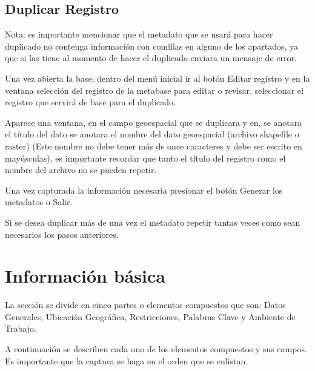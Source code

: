 \documentclass[twoside]{book}
\begin{document}
\section{Duplicar Registro}


Nota: es importante mencionar que el metadato que se usará para hacer duplicado no contenga información con comillas en alguno de los apartados, ya que si las tiene al momento de hacer el duplicado enviara un mensaje de error. 

Una vez abierta la base, dentro del menú inicial ir al botón Editar registro y en la ventana selección del registro de la metabase para editar o revisar, seleccionar el registro que servirá de base para el duplicado.

Aparece una ventana, en el campo geoespacial que se duplicara y en, se anotara el título del dato se anotara el nombre del dato geoespacial (archivo shapefile o raster) (Este nombre no debe tener más de once caracteres y debe ser escrito en mayúsculas), es importante recordar que tanto el título del registro como el nombre del archivo no se pueden repetir.

Una vez capturada la información necesaria presionar el botón Generar los metadatos o Salir.

Si se desea duplicar más de una vez el metadato repetir tantas veces como sean necesarios los pasos anteriores.

\chapter{Información básica}

La sección se divide en cinco partes o elementos compuestos que son: Datos Generales, Ubicación Geográfica, Restricciones, Palabras Clave y Ambiente de Trabajo.

A continuación se describen cada uno de los elementos compuestos y sus campos. Es importante que la captura se haga en el orden que se enlistan.
\end{document}
